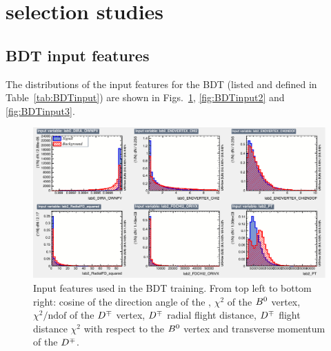 \section[$\Bz\to\Dmp\pipm$ selection studies]{\boldmath{$\Bz\to\Dmp\pipm$} selection studies}
\label{app:selectionStudies}

\subsection{BDT input features}
\label{app:BDTinput}
The distributions of the input features for the BDT (listed and defined in Table~\ref{tab:BDTinput})
are shown in Figs.~\ref{fig:BDTinput1}, \ref{fig:BDTinput2} and \ref{fig:BDTinput3}.

\begin{figure}[htpb]
  \begin{center}
    \includegraphics[width=\textwidth]{AA-Appdx-selection/figs/variables_id_c1.pdf}
  \end{center}
  \vspace{-2mm}
  \caption{Input features used in the BDT training. From top left to bottom right: cosine of the direction angle of
  		the \Bz, $\chi^2$ of the $B^0$ vertex, $\chi^2/\text{ndof}$ of the $D^\mp$ vertex, $D^\mp$ radial flight
  		distance, $D^\mp$ flight distance $\chi^2$ with respect to the $B^0$ vertex and transverse momentum of the $D^\mp$.}
  \label{fig:BDTinput1}
\end{figure}
